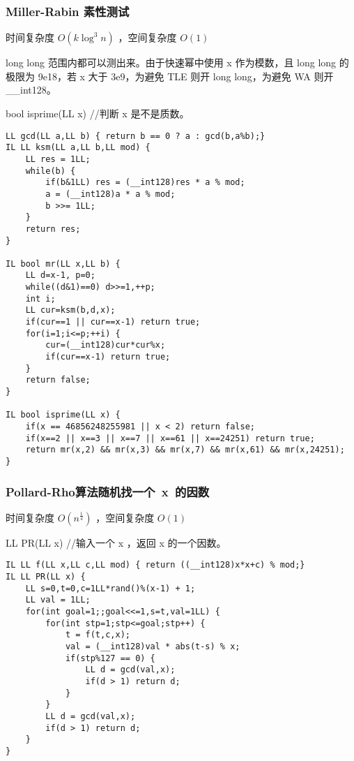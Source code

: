 \documentclass[UTF8]{ctexart}
\begin{document}
\subsubsection{Miller-Rabin 素性测试}
时间复杂度 $O(k \log^3 n)$ ，空间复杂度 $O(1)$

long long 范围内都可以测出来。由于快速幂中使用 x 作为模数，且 long long 的极限为 9e18，若 x 大于 3e9，为避免 TLE 则开 long long，为避免 WA 则开 \_\_int128。

bool isprime(LL x)                      //判断 x 是不是质数。

\begin{framed}
\begin{lstlisting}
LL gcd(LL a,LL b) { return b == 0 ? a : gcd(b,a%b);}
IL LL ksm(LL a,LL b,LL mod) {
    LL res = 1LL;
    while(b) {
        if(b&1LL) res = (__int128)res * a % mod;
        a = (__int128)a * a % mod;
        b >>= 1LL;
    }
    return res;
}

IL bool mr(LL x,LL b) {
    LL d=x-1, p=0;
    while((d&1)==0) d>>=1,++p;
    int i;
    LL cur=ksm(b,d,x);
    if(cur==1 || cur==x-1) return true;
    for(i=1;i<=p;++i) {
        cur=(__int128)cur*cur%x;
        if(cur==x-1) return true;
    }
    return false;
}

IL bool isprime(LL x) {
    if(x == 46856248255981 || x < 2) return false;
    if(x==2 || x==3 || x==7 || x==61 || x==24251) return true;
    return mr(x,2) && mr(x,3) && mr(x,7) && mr(x,61) && mr(x,24251);
}
\end{lstlisting}
\end{framed}

\subsubsection{Pollard-Rho算法随机找一个\ x\ 的因数}
时间复杂度 $O(n^{\frac{1}{4}})$ ，空间复杂度 $O(1)$

LL PR(LL x)                 //输入一个 x ，返回 x 的一个因数。

\begin{framed}
\begin{lstlisting}
IL LL f(LL x,LL c,LL mod) { return ((__int128)x*x+c) % mod;}
IL LL PR(LL x) {
    LL s=0,t=0,c=1LL*rand()%(x-1) + 1;
    LL val = 1LL;
    for(int goal=1;;goal<<=1,s=t,val=1LL) {
        for(int stp=1;stp<=goal;stp++) {
            t = f(t,c,x);
            val = (__int128)val * abs(t-s) % x;
            if(stp%127 == 0) {
                LL d = gcd(val,x);
                if(d > 1) return d;
            }
        }
        LL d = gcd(val,x);
        if(d > 1) return d;
    }
}
\end{lstlisting}
\end{framed}
\end{document}
